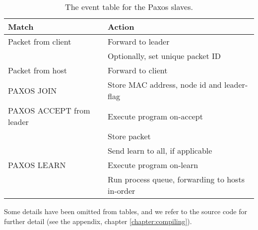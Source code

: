\begin{table}[H]
  \centering
  \begin{tabular}{|l|l|}
    \hline \textbf{Match} & \textbf{Action} \\
    \hline Packet from client & Forward to leader \\
                       & Optionally, set unique packet ID \\
    \hline Packet from host & Forward to client  \\
    \hline PAXOS JOIN & Store MAC address, node id and leader-flag \\
    \hline PAXOS ACCEPT from leader & Execute program on-accept \\
                                    & Store packet \\
                                    & Send learn to all, if applicable \\
    \hline PAXOS LEARN & Execute program on-learn \\
                       & Run process queue, forwarding to hosts in-order \\
    \hline
  \end{tabular}
  \caption{The event table for the Paxos slaves.}
  \label{table:complete.match.slave}
\end{table}

Some details have been omitted from tables, and we refer to the source code
for further detail (see the appendix, chapter \ref{chapter:compiling}).


